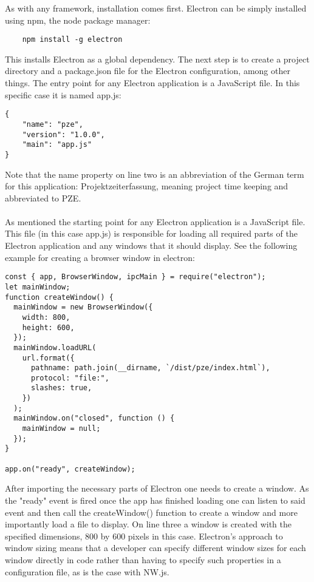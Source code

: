 
As with any framework, installation comes first.
Electron can be simply installed using npm, the node package manager: \parencite{npm}
\begin{lstlisting}
    npm install -g electron
\end{lstlisting}
This installs Electron as a global dependency. 
The next step is to create a project directory and a package.json file for the Electron configuration, among other things. 
The entry point for any Electron application is a JavaScript file. 
In this specific case it is named app.js:
\begin{lstlisting}
{
    "name": "pze",
    "version": "1.0.0",
    "main": "app.js"
}
\end{lstlisting}
Note that the name property on line two is an abbreviation of the German term for this application:
Projektzeiterfassung, meaning project time keeping and abbreviated to PZE.\paragraph{}
As mentioned the starting point for any Electron application is a JavaScript file. 
This file (in this case app.js) is responsible for loading all required parts of the Electron application 
and any windows that it should display.
See the following example for creating a browser window in electron:
\begin{lstlisting}
const { app, BrowserWindow, ipcMain } = require("electron");
let mainWindow;
function createWindow() {
  mainWindow = new BrowserWindow({
    width: 800,
    height: 600,
  });
  mainWindow.loadURL(
    url.format({
      pathname: path.join(__dirname, `/dist/pze/index.html`),
      protocol: "file:",
      slashes: true,
    })
  );
  mainWindow.on("closed", function () {
    mainWindow = null;
  });
}

app.on("ready", createWindow);
\end{lstlisting}
After importing the necessary parts of Electron one needs to create a window. 
As the "ready" event is fired once the app has finished loading one can listen to said event
and then call the createWindow() function to create a window and more importantly load a file to display.
On line three a window is created with the specified dimensions, 800 by 600 pixels in this case. 
Electron's approach to window sizing means that a developer can specify different window sizes for each
window directly in code rather than having to specify such properties in a configuration file, as is 
the case with NW.js. \parencite{jensen2017}

